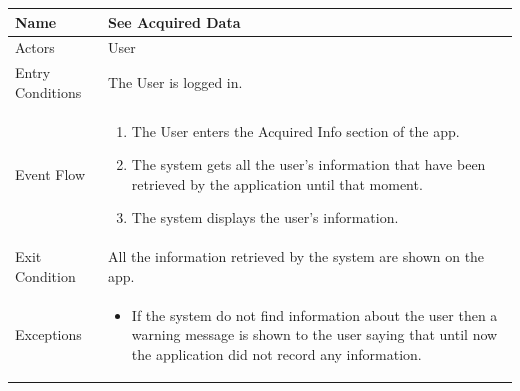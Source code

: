 \begin{enumerate}
\FloatBarrier
\begin{table}[h]
\begin{tabular}{|l|p{}|}
\hline
Name             & See Acquired Data \\ \hline
Actors           & User  \\ \hline
Entry Conditions & The User is logged in. \\ \hline
Event Flow       & \begin{enumerate}
            \item The User enters the Acquired Info section of the app.
            \item The system gets all the user's information that have been retrieved by the application until that moment.
            \item The system displays the user's information.
\end{enumerate}\\ \hline
Exit Condition   & All the information retrieved by the system are shown on the app.\\ \hline
Exceptions       & \begin{itemize}
\item If the system do not find information about the user then a warning message is shown to the user saying that until now the application did not record any information.
\end{itemize}  \\ \hline
\end{tabular}
\end{table}
\FloatBarrier


\end{enumerate}
